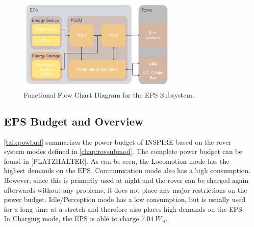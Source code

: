 \begin{figure}[htb]
{\centering
\includegraphics[width=0.7\textwidth]{Media/epsflowchart}
\caption{Functional Flow Chart Diagram for the EPS Subsystem.}
\label{fig:epsflowchart}
}
\end{figure}

\subsection{EPS Budget and Overview}
\autoref{tab:powbud} summarizes the power budget of INSPIRE based on the rover system modes defined in \autoref{chap:rovsubmod}. The complete power budget can be found in [PLATZHALTER].
As can be seen, the Locomotion mode has the highest demands on the EPS. Communication mode also has a high consumption. However, since this is primarily used at night and the rover can be charged again afterwards without any problems, it does not place any major restrictions on the power budget. Idle/Perception mode has a low consumption, but is usually used for a long time at a stretch and therefore also places high demands on the EPS. In Charging mode, the EPS is able to charge $7.04 \ W_{el} $.


